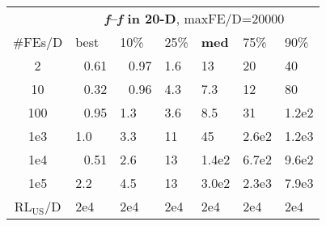 \begin{tabular}{c|llllll}
 & \multicolumn{6}{|c}{\textbf{\textit{f}\raisebox{-0.35ex}{1}--\textit{f}\raisebox{-0.35ex}{24} in 20-D}, maxFE/D=20000}\\
\#FEs/D & best & 10\% & 25\% & \textbf{med} & 75\% & 90\%\\
2 & ~\,0.61 & ~\,0.97 & \hspace*{1ex}1.6 & 13 & 20 & 40\\
10 & ~\,0.32 & ~\,0.96 & \hspace*{1ex}4.3 & \hspace*{1ex}7.3 & 12 & 80\\
100 & ~\,0.95 & \hspace*{1ex}1.3 & \hspace*{1ex}3.6 & \hspace*{1ex}8.5 & 31 & 1.2e2\\
1e3 & \hspace*{1ex}1.0 & \hspace*{1ex}3.3 & 11 & 45 & 2.6e2 & 1.2e3\\
1e4 & ~\,0.51 & \hspace*{1ex}2.6 & 13 & 1.4e2 & 6.7e2 & 9.6e2\\
1e5 & \hspace*{1ex}2.2 & \hspace*{1ex}4.5 & 13 & 3.0e2 & 2.3e3 & 7.9e3\\
$\text{RL}_{\text{US}}$/D & 2e4 & 2e4 & 2e4 & 2e4 & 2e4 & 2e4
\end{tabular}
